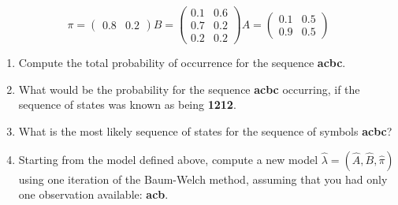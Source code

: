 \documentclass[12pt]{article}
\begin{document}
\begin{displaymath}
    \pi = 
    \begin{pmatrix}
        0.8 & 0.2
    \end{pmatrix}
    B = 
    \begin{pmatrix}
        0.1 & 0.6 \\
        0.7 & 0.2 \\
        0.2 & 0.2 
    \end{pmatrix}
    A = 
    \begin{pmatrix}
        0.1 & 0.5 \\
        0.9 & 0.5
    \end{pmatrix}
\end{displaymath}

\begin{enumerate}
\item Compute the total probability of occurrence for the sequence {\bf acbc}.

\item What would be the probability for the sequence {\bf acbc} occurring, if the sequence of states was known as being {\bf 1212}.

\item What is the most likely sequence of states for the sequence of symbols {\bf acbc}? 
\item Starting from the model defined above, compute a new model $\hat\lambda = (\hat{A}, \hat{B}, \hat\pi)$ using one iteration of the Baum-Welch method, assuming that you had only one observation available: \textbf{acb}.
\end{enumerate}
\end{document}
